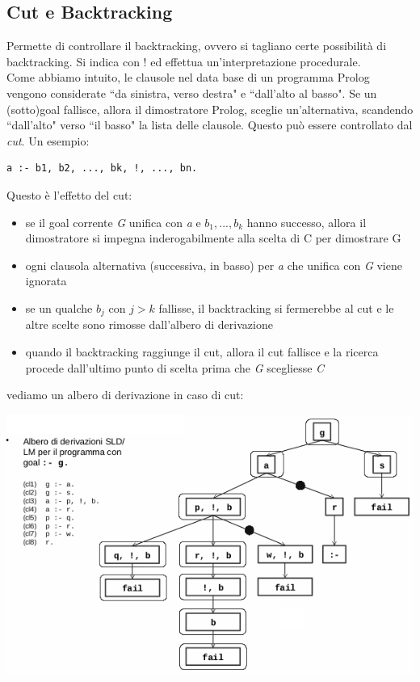 \documentclass[a4paper,12pt, oneside]{book}
\begin{document}
\subsection{Cut e Backtracking}
Permette di controllare il backtracking, ovvero si tagliano certe possibilità di backtracking. Si indica con $!$ ed effettua un'interpretazione procedurale. \\
Come abbiamo intuito, le clausole nel data base di un programma
Prolog vengono considerate “da sinistra, verso destra" e “dall'alto al
basso". Se un (sotto)goal fallisce, allora il dimostratore Prolog, sceglie un'alternativa, scandendo “dall'alto" verso “il basso" la lista delle clausole. Questo può essere controllato dal \textit{cut}. Un esempio:
\begin{verbatim}
a :- b1, b2, ..., bk, !, ..., bn.
\end{verbatim}
Questo è l'effetto del cut:
\begin{itemize}
\item se il goal corrente \textit{G} unifica con \textit{a} e $b_1,...,b_k$ hanno successo, allora il dimostratore si impegna inderogabilmente alla scelta di C per dimostrare G
\item ogni clausola alternativa (successiva, in basso) per \textit{a} che unifica con \textit{G} viene ignorata
\item se un qualche $b_j$ con $j > k$ fallisse, il backtracking si fermerebbe al cut e le altre scelte sono rimosse dall'albero di derivazione
\item quando il backtracking raggiunge il cut, allora il cut fallisce e la ricerca procede dall’ultimo punto di scelta prima che \textit{G} scegliesse \textit{C}
\end{itemize}
vediamo un albero di derivazione in caso di cut:
\begin{center}
	\includegraphics[scale=0.8]{img/cut.png}
\end{center}
\end{document}
